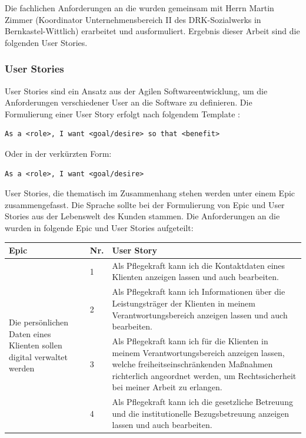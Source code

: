 Die fachlichen Anforderungen an die \EBP wurden gemeinsam mit Herrn Martin Zimmer (Koordinator Unternehmensbereich II des DRK-Sozialwerks in
Bernkastel-Wittlich) erarbeitet und ausformuliert. Ergebnis dieser Arbeit sind die folgenden User Stories.

\subsubsection{User Stories}
User Stories sind ein Ansatz aus der Agilen Softwareentwicklung, um die Anforderungen verschiedener User an die Software zu definieren. Die
Formulierung einer User Story erfolgt nach folgendem Template \cite{Wikipedia_User_Story}:
\begin{lstlisting}
As a <role>, I want <goal/desire> so that <benefit>
\end{lstlisting}
Oder in der verkürzten Form:
\begin{lstlisting}
As a <role>, I want <goal/desire>
\end{lstlisting}
User Stories, die thematisch im Zusammenhang stehen werden unter einem Epic zusammengefasst. Die Sprache sollte bei der Formulierung
 von Epic und User Stories aus der Lebenswelt des Kunden stammen. Die Anforderungen an die \EBP wurden in folgende Epic und User Stories aufgeteilt:
\newline

\begin{longtable}{| p{}|p{}|p{} | }
  \hline
 \textbf{Epic} & \textbf{Nr.} & \textbf{User Story} \\
  \hline
\multirow{4}{0.25\textwidth}{Die persönlichen Daten eines Klienten sollen digital verwaltet werden} & 1 & Als Pflegekraft kann ich die Kontaktdaten eines Klienten anzeigen lassen und auch bearbeiten.  \\
  \cline{2 -3}
& 2 & Als Pflegekraft kann ich Informationen über die Leistungsträger der Klienten in meinem Verantwortungsbereich anzeigen lassen und
auch bearbeiten.\\
   \cline{2 - 3}
& 3 & Als Pflegekraft kann ich für die Klienten in meinem Verantwortungsbereich anzeigen lassen, welche freiheitseinschränkenden
Maßnahmen richterlich angeordnet werden, um Rechtssicherheit bei meiner Arbeit zu erlangen.\\
   \cline{2 - 3}
& 4 & Als Pflegekraft kann ich die gesetzliche Betreuung und die institutionelle Bezugsbetreuung anzeigen lassen und auch bearbeiten.\\
  \hline
\end{longtable}

